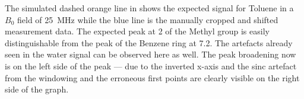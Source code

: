 The simulated dashed orange line in  shows the expected signal for Toluene in a \(B_0\) field of \qty{25}{\mega\hertz} while the blue line is the manually cropped and shifted measurement data. The expected peak at \qty{2}{\partspermillion} of the Methyl group is easily distinguishable from the peak of the Benzene ring at \approx{}\qty{7.2}{\partspermillion}. The artefacts already seen in the water signal can be observed here as well. The peak broadening now is on the left side of the peak --- due to the inverted x-axis and the sinc artefact from the windowing and the erroneous first points are clearly visible on the right side of the graph.
